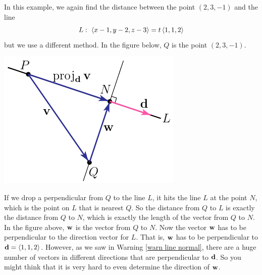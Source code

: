 \begin{eg}
\label{eg:VPdistance-point-line-bis}
In this example, we again find the distance between the point $(2,3,-1)$ 
and the line
\begin{equation*}
L:\  \left< x-1,y-2,z-3\right>=t\left< 1,1,2\right>
\end{equation*}
but we use a different method. In the figure below, $Q$ is the point $(2,3,-1)$. 
\begin{efig}
\begin{center}
     \includegraphics{pointDistProjB.pdf}
\end{center}
\end{efig}
If we drop a perpendicular from $Q$ to the line $L$, it hits the line $L$ 
at the point $N$, which is the point on $L$ that is nearest $Q$. So 
the distance from $Q$ to $L$ is exactly the distance from $Q$ to $N$, which 
is exactly the length of the vector from $Q$ to $N$. In the figure above,
$\mathbf{w}$ is the vector from $Q$ to $N$. Now the vector $\mathbf{w}$ has to be perpendicular to the direction vector for $L$. That is,  $\mathbf{w}$ has to be perpendicular to $\mathbf{d}=\left< 1,1,2\right>$. However, as we saw in Warning
\ref{warn line normal}, there are a huge number of vectors in different 
directions that are perpendicular to $\mathbf{d}$. So you might think that it is very hard to even determine the direction of $\mathbf{w}$. 


\end{eg}
